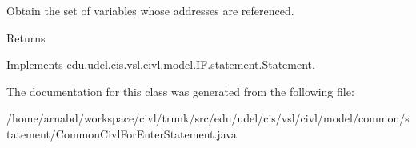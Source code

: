 Obtain the set of variables whose addresses are referenced. 

\begin{DoxyReturn}{Returns}

\end{DoxyReturn}


Implements \hyperlink{interfaceedu_1_1udel_1_1cis_1_1vsl_1_1civl_1_1model_1_1IF_1_1statement_1_1Statement_abe668e1bcb4297c9e6e7f8f65aeecfc2}{edu.\+udel.\+cis.\+vsl.\+civl.\+model.\+I\+F.\+statement.\+Statement}.



The documentation for this class was generated from the following file\+:\begin{DoxyCompactItemize}
\item 
/home/arnabd/workspace/civl/trunk/src/edu/udel/cis/vsl/civl/model/common/statement/Common\+Civl\+For\+Enter\+Statement.\+java\end{DoxyCompactItemize}
